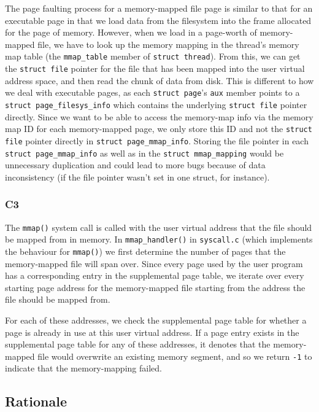 \documentclass[a4wide, 11pt]{article}
\newcommand{\tx}{\texttt}
\begin{document}
The page faulting process for a memory-mapped file page is similar to that for an executable page in that we load data from the filesystem into the frame allocated for the page of memory. However, when we load in a page-worth of memory-mapped file, we have to look up the memory mapping in the thread's memory map table (the \tx{mmap\_table} member of \tx{struct thread}). From this, we can get the \tx{struct file} pointer for the file that has been mapped into the user virtual address space, and then read the chunk of data from disk. This is different to how we deal with executable pages, as each \tx{struct page}'s \tx{aux} member points to a \tx{struct page\_filesys\_info} which contains the underlying \tx{struct file} pointer directly. Since we want to be able to access the memory-map info via the memory map ID for each memory-mapped page, we only store this ID and not the \tx{struct file} pointer directly in \tx{struct page\_mmap\_info}. Storing the file pointer in each \tx{struct page\_mmap\_info} as well as in the \tx{struct mmap\_mapping} would be unnecessary duplication and could lead to more bugs because of data inconsistency (if the file pointer wasn't set in one struct, for instance).

\subsubsection{C3}

The \tx{mmap()} system call is called with the user virtual address that the file should be mapped from in memory. In \tx{mmap\_handler()} in \tx{syscall.c} (which implements the behaviour for \tx{mmap()}) we first determine the number of pages that the memory-mapped file will span over. Since every page used by the user program has a corresponding entry in the supplemental page table, we iterate over every starting page address for the memory-mapped file starting from the address the file should be mapped from.

For each of these addresses, we check the supplemental page table for whether a page is already in use at this user virtual address. If a page entry exists in the supplemental page table for any of these addresses, it denotes that the memory-mapped file would overwrite an existing memory segment, and so we return \tx{-1} to indicate that the memory-mapping failed.

\subsection{Rationale}
\end{document}
